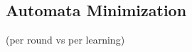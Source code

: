 \subsection{Automata Minimization} \label{subs_minimizationintheframework}
(per round vs per learning)

